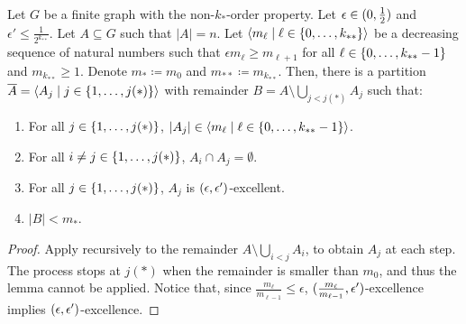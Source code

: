     \begin{lemma}[Claim 5.14.1] \label{lem:existance_of_excellent_partition}
        Let $G$ be a finite graph with the non-$k_{*}$-order property.
        Let $\epsilon \in ( 0, \frac{1}{2} )$ and $\epsilon' \leq \frac{1}{2^{k_{**}}}$.
        Let $A \subseteq G$ such that $|A| = n$.
        Let $\left< m_\ell \mid \ell \in \{ 0, \dots, k_{**} \} \right>$ be a decreasing sequence of natural numbers such that
        $\epsilon m_{\ell} \geq m_{\ell+1}$ for all $\ell \in \{ 0, \dots, k_{**}-1 \}$ and $m_{k_{**}} \geq 1$.
        Denote $m_* \coloneqq m_0$ and $m_{**} \coloneqq m_{k_{**}}$.
        Then, there is a partition $\overline{A} = \left< A_j \mid j \in \{ 1, \dots, j(*) \} \right>$ with remainder
        $B = A \setminus \bigcup_{j < j(*)} A_j$ such that:
        \begin{enumerate}[label=(\alph*), ref=\alph*]
            \item \label{itm:existance_of_excellent_partition.a} For all $j \in \{ 1, \dots, j(*) \}$, $|A_j| \in \left< m_\ell \mid \ell \in \{ 0, \dots, k_{**}-1 \} \right>$.
            \item \label{itm:existance_of_excellent_partition.b} For all $i \neq j \in \{ 1, \dots, j(*) \}$, $A_i \cap A_j = \emptyset$.
            \item \label{itm:existance_of_excellent_partition.c} For all $j \in \{ 1, \dots, j(*) \}$, $A_j$ is $( \epsilon, \epsilon' )$-excellent.
            \item \label{itm:existance_of_excellent_partition.d} $|B| < m_*$.
        \end{enumerate}
        \begin{proof}
            Apply  recursively to the remainder
            $A \setminus \bigcup_{i < j} A_i$, to obtain $A_j$ at each step.
            The process stops at $j(*)$ when the remainder is smaller than $m_0$, and thus the lemma cannot be applied.
            Notice that, since $\frac{m_\ell}{m_{\ell-1}} \leq \epsilon$, $( \frac{m_\ell}{m_{\ell-1}}, \epsilon' )$-excellence
            implies $( \epsilon, \epsilon' )$-excellence.
        \end{proof}
    \end{lemma}


